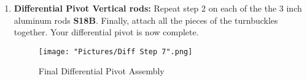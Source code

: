 \documentclass[12pt]{article}
\begin{document}
\begin{enumerate}
\item \textbf{Differential Pivot Vertical rods:} Repeat step 2 on each of the the 3 inch aluminum rods \textbf{S18B}. Finally, attach all the pieces of the turnbuckles together.  Your differential pivot is now complete. 

\begin{figure}[H]
\centering	
  \texttt{[image: "Pictures/Diff Step 7".png]}
	\caption{Final Differential Pivot Assembly}
\end{figure}


\end{enumerate}
\end{document}

